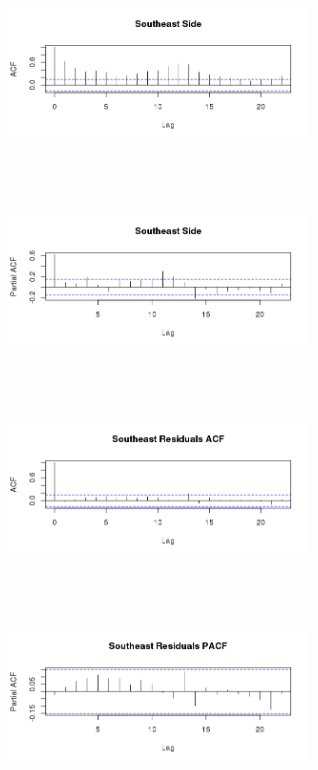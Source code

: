 \documentclass{article} %
\begin{document}
\begin{multicols}{2}
 
\begin{figure}[H]
\includegraphics[height=50mm, width=80mm]{Plots/southeast_acf.png}
\end{figure}
 
\begin{figure}[H]
\includegraphics[height=50mm, width=80mm]{Plots/southeast_PACF.png}
\end{figure}
 
\begin{figure}[H]
\includegraphics[height=50mm, width=80mm]{Plots/southeast_resid_acf.png}
\end{figure}
 
\begin{figure}[H]
\includegraphics[height=50mm, width=80mm]{Plots/southeast_resid_pacf.png}
\end{figure}
 
\end{multicols}
 
\end{document}
